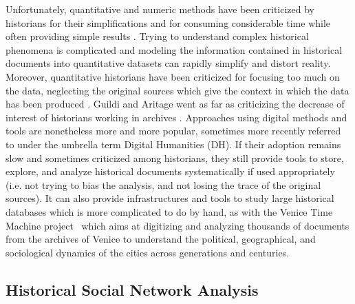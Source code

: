 Unfortunately, quantitative and numeric methods have been criticized by historians for their simplifications and for consuming considerable time while often providing simple results \cite{karila-cohenNouvellesCuisinesHistoire2018,lepetitHistoireQuantitativeDeux1989}.
Trying to understand complex historical phenomena is complicated and modeling the information contained in historical documents into quantitative datasets can rapidly simplify and distort reality.
Moreover, quantitative historians have been criticized for focusing too much on the data, neglecting the original sources which give the context in which the data has been produced \cite{lemercierQuantitativeMethodsHumanities2019}.
Guildi and Aritage went as far as criticizing the decrease of interest of historians working in archives \cite{guldiHistoryManifesto2014}.
Approaches using digital methods and tools are nonetheless more and more popular, sometimes more recently referred to under the umbrella term Digital Humanities (DH).
If their adoption remains slow and sometimes criticized among historians, they still provide tools to store, explore, and analyze historical documents systematically if used appropriately (i.e. not trying to bias the analysis, and not losing the trace of the original sources).
It can also provide infrastructures and tools to study large historical databases which is more complicated to do by hand, as with the Venice Time Machine project~\cite{kaplanVeniceTimeMachine2015} which aims at digitizing and analyzing thousands of documents from the archives of Venice to understand the political, geographical, and sociological dynamics of the cities across generations and centuries.


\subsection{Historical Social Network Analysis}\label{subsec:historical-social-network-analsyis}

